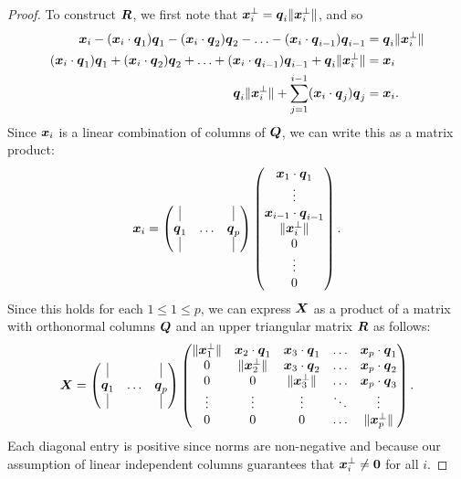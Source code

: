 \documentclass[12pt]{article}
\begin{document}
\begin{proof}
		To construct $\boldsymbol{R}$, we first note that $\boldsymbol{x}_i^{\perp}=\boldsymbol{q}_i\|\boldsymbol{x}_i^{\perp}\|$, and so
		\begin{align}
			\boldsymbol{x}_i-(\boldsymbol{x}_i\cdot\boldsymbol{q}_1)\boldsymbol{q}_1-
			(\boldsymbol{x}_i\cdot\boldsymbol{q}_2)\boldsymbol{q}_2-\ldots-(\boldsymbol{x}_i\cdot\boldsymbol{q}_{i-1})\boldsymbol{q}_{i-1}&=\boldsymbol{q}_i\|\boldsymbol{x}_i^{\perp}\|\\
			(\boldsymbol{x}_i\cdot\boldsymbol{q}_1)\boldsymbol{q}_1+
			(\boldsymbol{x}_i\cdot\boldsymbol{q}_2)\boldsymbol{q}_2+\ldots+(\boldsymbol{x}_i\cdot\boldsymbol{q}_{i-1})\boldsymbol{q}_{i-1}+\boldsymbol{q}_i\|\boldsymbol{x}_i^{\perp}\|&=\boldsymbol{x}_i\\
			\boldsymbol{q}_i\|\boldsymbol{x}_i^{\perp}\|+\sum_{j=1}^{i-1}(\boldsymbol{x}_i\cdot\boldsymbol{q}_j)\boldsymbol{q}_j&=\boldsymbol{x}_i.
		\end{align}
		Since $\boldsymbol{x}_i$ is a linear combination of columns of $\boldsymbol{Q}$, we can write this as a matrix product:
		\begin{equation}
			\bmx_i=\begin{pmatrix}
				\vline &  & \vline \\ \bmq_1 & \ldots & \bmq_p \\ \vline & & \vline
			\end{pmatrix}\begin{pmatrix}
			\bmx_1\cdot\bmq_1\\ \vdots \\ \bmx_{i-1}\cdot\bmq_{i-1} \\ \|\bmx_i^{\perp}\| \\ 0 \\ \vdots \\ 0
			\end{pmatrix}.
		\end{equation}
		Since this holds for each $1\leq 1\leq p$, we can express $\boldsymbol{X}$ as a product of a matrix with orthonormal columns $\boldsymbol{Q}$ and an upper triangular matrix $\boldsymbol{R}$ as follows:
		\begin{equation}
			\bmX=\begin{pmatrix}
				\vline &  & \vline \\ \bmq_1 & \ldots & \bmq_p \\ \vline & & \vline
			\end{pmatrix}\begin{pmatrix}
				\|\bmx_1^{\perp}\| & \bmx_2\cdot\bmq_1 & \bmx_3\cdot\bmq_1 & \ldots & \bmx_p\cdot\bmq_1 \\ 
				0 & \|\bmx_2^{\perp}\| & \bmx_3\cdot\bmq_2 &\ldots & \bmx_p\cdot\bmq_2\\ 
				0 & 0 & \|\bmx_3^{\perp}\| & \ldots & \bmx_p\cdot\bmq_3\\
				\vdots & \vdots & \vdots & \ddots & \vdots \\ 
				0 & 0 & 0 & \ldots & \|\bmx_p^{\perp}\|
			\end{pmatrix}.
		\end{equation}
		Each diagonal entry is positive since norms are non-negative and because our assumption of linear independent columns guarantees that $\boldsymbol{x}_i^{\perp}\neq \textbf{0}$ for all $i$.
	\end{proof}
	\pagebreak
\end{document}
